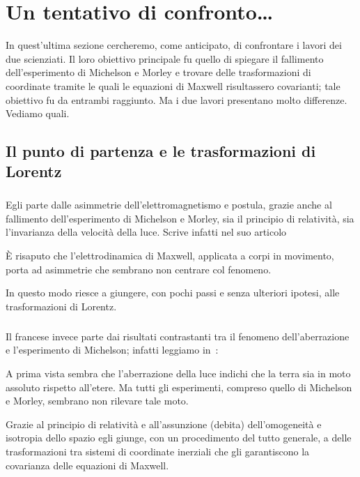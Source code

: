 \chapter{Un tentativo di confronto\ldots}
\minitoc
In quest'ultima sezione cercheremo, come anticipato, di confrontare i
lavori dei due scienziati. Il loro obiettivo principale fu quello di
spiegare il fallimento dell'esperimento di Michelson e Morley e trovare
delle trasformazioni di coordinate tramite le quali le equazioni di
Maxwell risultassero covarianti; tale obiettivo fu da entrambi
raggiunto. Ma i due lavori presentano molto differenze. Vediamo quali.
\section[Il punto di partenza]{Il punto di partenza e le
  trasformazioni di Lorentz}

\paragraph{\ein} Egli parte dalle asimmetrie dell'elettromagnetismo e
postula, grazie anche al fallimento dell'esperimento di Michelson e
Morley, sia il principio di relativit\`a, sia l'invarianza della
velocit\`a della luce. Scrive infatti nel suo articolo
\begin{citaz}
  \`E risaputo che l'elettrodinamica di Maxwell, applicata a corpi in
  movimento, porta ad asimmetrie che sembrano non centrare col
  fenomeno.
\end{citaz}

In questo modo riesce a giungere, con pochi passi e senza ulteriori
ipotesi, alle trasformazioni di Lorentz.

\paragraph{\poin} Il francese invece parte dai risultati contrastanti
tra il fenomeno dell'aberrazione e l'esperimento di Michelson; infatti
leggiamo in~\cite{carro1}:
\begin{citaz}
  A prima vista sembra che l'aberrazione della luce indichi che la
  terra sia in moto assoluto rispetto all'etere. Ma tutti gli
  esperimenti, compreso quello di Michelson e Morley, sembrano non
  rilevare tale moto.
\end{citaz}
 Grazie al principio di relativit\`a e all'assunzione (debita)
dell'omogeneit\`a e isotropia dello spazio egli giunge, con un
procedimento del tutto generale, a delle trasformazioni tra sistemi di
coordinate inerziali che gli garantiscono 
la covarianza delle equazioni di Maxwell.

